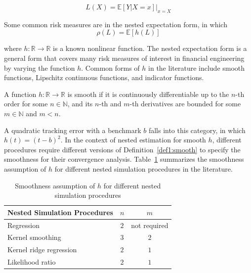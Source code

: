 $$ L(X) = \mathbb{E}\left[ Y|X=x \right]\vert_{x=X} $$

Some common risk measures are in the nested expectation form, in which 
$$\rho(L) = \mathbb{E}\left[ h(L) \right]$$

where $h: \mathbb{R} \rightarrow \mathbb{R}$ is a known nonlinear function. 
The nested expectation form is a general form that covers many risk measures of interest in financial engineering by varying the function $h$.
Common forms of $h$ in the literature include smooth functions, Lipschitz continuous functions, and indicator functions.

\begin{definition} \label{def1:smooth}
    A function $h: \mathbb{R} \rightarrow \mathbb{R}$ is smooth if it is continuously differentiable up to the $n$-th order for some $n \in \mathbb{N}$, 
    and its $n$-th and $m$-th derivatives are bounded for some $m \in \mathbb{N}$ and $m < n$.
\end{definition}

A quadratic tracking error with a benchmark $b$ falls into this category, in which $h(t) = (t - b)^2$.
In the context of nested estimation for smooth $h$, different procedures require different versions of Definition~\ref{def1:smooth} to specify the smoothness for their convergence analysis.
Table~\ref{tab1:smoothness} summarizes the smoothness assumption of $h$ for different nested simulation procedures in the literature.

\begin{table}[ht!]
    \centering
    \begin{tabular}{lcc}
    \toprule
    \textbf{Nested Simulation Procedures} & $n$ & $m$ \\
    \midrule
    Regression & $2$ & not required \\
    Kernel smoothing & $3$ & $2$ \\
    Kernel ridge regression & $2$ & $1$ \\
    Likelihood ratio & $2$ & $1$ \\
    \bottomrule
    \end{tabular}
    \caption{Smoothness assumption of $h$ for different nested simulation procedures}
    \label{tab1:smoothness}
\end{table}

